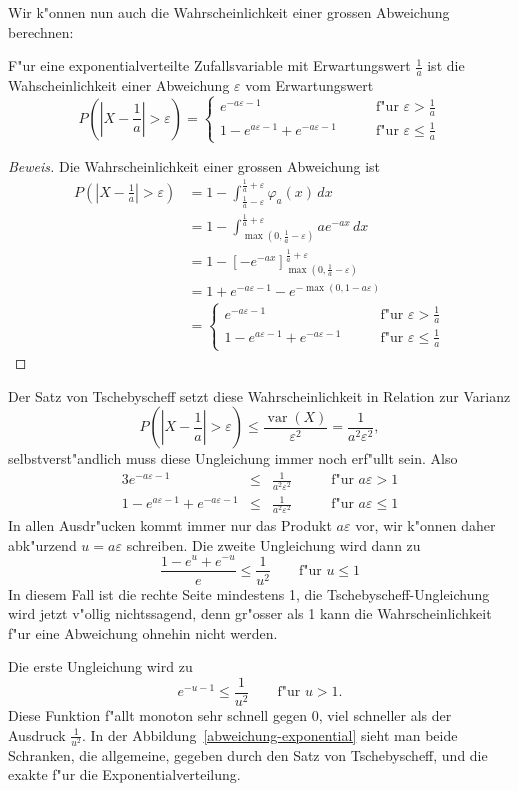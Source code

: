 {
\small
Wir k"onnen nun auch die Wahrscheinlichkeit einer grossen Abweichung
berechnen:
\begin{satz} F"ur eine exponentialverteilte Zufallsvariable mit
Erwartungswert $\frac1a$ ist die Wahscheinlichkeit einer Abweichung
$\varepsilon$ vom Erwartungswert
\[
P(|X-{\textstyle\frac1a}|>\varepsilon)=
\begin{cases}
e^{-a\varepsilon-1}&\qquad\text{f"ur $\varepsilon > \frac1a$}\\
1-e^{a\varepsilon-1}+e^{-a\varepsilon-1}&\qquad\text{f"ur $\varepsilon \le \frac1a$}
\end{cases}
\]
\end{satz}
\begin{proof}[Beweis]
Die Wahrscheinlichkeit einer grossen Abweichung ist
\begin{align*}
P(|X-{\textstyle\frac1a}|>\varepsilon)
&=1-\int_{\frac1a-\varepsilon}^{\frac1a+\varepsilon}\varphi_a(x)\,dx\\
&=1-\int_{\max(0,\frac1a-\varepsilon)}^{\frac1a+\varepsilon}ae^{-ax}\,dx\\
&=1-\left[-e^{-ax}\right]_{\max(0,\frac1a-\varepsilon)}^{\frac1a+\varepsilon}\\
&=1+e^{-a\varepsilon-1}-e^{-\max(0,1-a\varepsilon)}\\
&=\begin{cases}
e^{-a\varepsilon-1}&\qquad\text{f"ur $\varepsilon > \frac1a$}\\
1-e^{a\varepsilon-1}+e^{-a\varepsilon-1}&\qquad\text{f"ur $\varepsilon \le \frac1a$}
\end{cases}
\end{align*}
\end{proof}
Der Satz von Tschebyscheff setzt diese Wahrscheinlichkeit in Relation
zur Varianz
\[
P(|X-{\textstyle\frac1a}|>\varepsilon)\le
\frac{\operatorname{var}(X)}{\varepsilon^2}=\frac{1}{a^2\varepsilon^2},
\]
selbstverst"andlich muss diese Ungleichung immer noch erf"ullt sein.
Also
\begin{alignat*}{3}
e^{-a\varepsilon-1}&\le&\frac1{a^2\varepsilon^2}&\qquad\text{f"ur $a\varepsilon>1$}\\
1-e^{a\varepsilon-1}+e^{-a\varepsilon-1}&\le&\frac1{a^2\varepsilon^2}&\qquad\text{f"ur $a\varepsilon\le1$}
\end{alignat*}
In allen Ausdr"ucken kommt immer nur das Produkt $a\varepsilon$ vor,
wir k"onnen daher
abk"urzend $u=a\varepsilon$ schreiben. Die zweite Ungleichung wird dann zu
\[
\frac{1-e^{u}+e^{-u}}e\le\frac1{u^2}\qquad\text{f"ur $u\le1$}
\]
In diesem Fall ist die rechte Seite mindestens 1,
die Tschebyscheff-Ungleichung wird jetzt v"ollig nichtssagend, denn 
gr"osser als 1 kann die Wahrscheinlichkeit f"ur eine Abweichung ohnehin
nicht werden.

Die erste Ungleichung wird zu
\[
e^{-u-1}\le\frac1{u^2}\qquad\text{f"ur $u > 1$}.
\]
Diese Funktion f"allt monoton sehr schnell gegen 0, viel schneller
als der Ausdruck $\frac1{u^2}$. In der Abbildung~\ref{abweichung-exponential}
sieht man beide Schranken, die allgemeine, gegeben durch den
Satz von Tschebyscheff, und die exakte f"ur die Exponentialverteilung.
}

